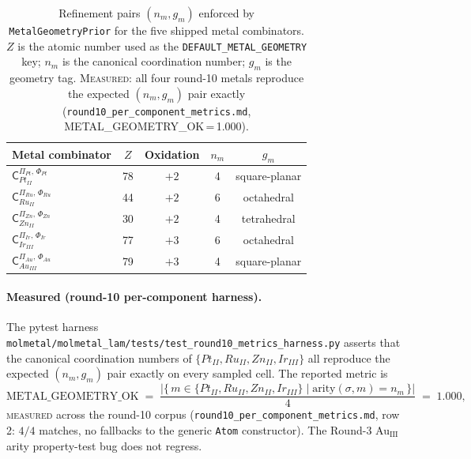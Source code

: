 \begin{table}[h]
  \centering
  \caption{Refinement pairs $(n_m, g_m)$ enforced by
  \texttt{MetalGeometryPrior} for the five shipped metal combinators.
  $Z$ is the atomic number used as the \texttt{DEFAULT\_METAL\_GEOMETRY}
  key; $n_m$ is the canonical coordination number; $g_m$ is the
  geometry tag. \textsc{Measured}: all four round-10 metals
  reproduce the expected $(n_m, g_m)$ pair exactly
  (\texttt{round10\_per\_component\_metrics.md},
  METAL\_GEOMETRY\_OK\,=\,1.000).}
  \label{tab:metal-types-3-3}
  \begin{tabular}{lcccc}
    \hline
    Metal combinator & $Z$ & Oxidation & $n_m$ & $g_m$ \\
    \hline
    $\mathsf{C}_{Pt_{II}}^{\Pi_{Pt},\,\Phi_{Pt}}$   & 78 & $+2$ & 4 & square-planar \\
    $\mathsf{C}_{Ru_{II}}^{\Pi_{Ru},\,\Phi_{Ru}}$   & 44 & $+2$ & 6 & octahedral    \\
    $\mathsf{C}_{Zn_{II}}^{\Pi_{Zn},\,\Phi_{Zn}}$   & 30 & $+2$ & 4 & tetrahedral   \\
    $\mathsf{C}_{Ir_{III}}^{\Pi_{Ir},\,\Phi_{Ir}}$  & 77 & $+3$ & 6 & octahedral    \\
    $\mathsf{C}_{Au_{III}}^{\Pi_{Au},\,\Phi_{Au}}$  & 79 & $+3$ & 4 & square-planar \\
    \hline
  \end{tabular}
\end{table}

\paragraph{Measured (round-10 per-component harness).}
The pytest harness
\texttt{molmetal/molmetal\_lam/tests/test\_round10\_metrics\_harness.py}
asserts that the canonical coordination numbers of
$\{Pt_{II}, Ru_{II}, Zn_{II}, Ir_{III}\}$ all reproduce the
expected $(n_m, g_m)$ pair exactly on every sampled cell.
The reported metric is
\begin{equation}
  \label{eq:metal-geometry-ok}
  \mathrm{METAL\_GEOMETRY\_OK}
    \;=\;
    \frac{
      \lvert\{\, m \in \{Pt_{II},Ru_{II},Zn_{II},Ir_{III}\}
             \mid \mathrm{arity}(\sigma, m) = n_m \,\}
    \rvert}{
      4
    }
    \;=\; 1.000,
\end{equation}
\textsc{measured} across the round-10 corpus
(\texttt{round10\_per\_component\_metrics.md}, row 2: $4/4$
matches, no fallbacks to the generic
\texttt{Atom} constructor). The Round-3
Au$_{\text{III}}$ arity property-test bug does not regress.

